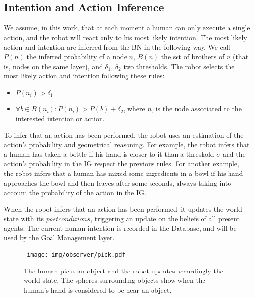 \subsection{Intention and Action Inference}
\label{sec:intention-intention and action inference}
We assume, in this work, that at each moment a human can only execute a single action, and the robot will react only to his most likely intention. The most likely action and intention are inferred from the BN in the following way. We call $P(n)$ the inferred probability of a node $n$, $B(n)$ the set of brothers of $n$ (that is, nodes on the same layer), and $\delta_1$, $\delta_2$ two thresholds. The robot selects the most likely action and intention following these rules: 
\begin{itemize}
\item  \(P(n_i)>\delta_1\) 
\item  \(\forall b \in B(n_i): P(n_i)>P(b)+\delta_2\), where $n_i$ is the node associated to the interested intention or action.
\end{itemize}

To infer that an action has been performed, the robot uses an estimation of the action's probability and geometrical reasoning. For example, the robot infers that a human has taken a bottle if his hand is closer to it than a threshold $\sigma$  and the action's probability in the IG respect the previous rules. For another example, the robot infers that a human has mixed some ingredients in a bowl if his hand approaches the bowl and then leaves after some seconds, always taking into account the probability of the action in the IG.

When the robot infers that an action has been performed, it updates the world state with its $postconditions$, triggering an update on the beliefs of all present agents. The current human intention is recorded in the Database, and will be used by the Goal Management layer.

 \begin{figure}[ht!]
	\centering
	\texttt{[image: img/observer/pick.pdf]}
	\caption[Actions and world update]{The human picks an object and the robot updates accordingly the world state. The spheres surrounding objects show when the human's hand is considered to be near an object.}
	\label{fig:intention-pick}
\end{figure}

